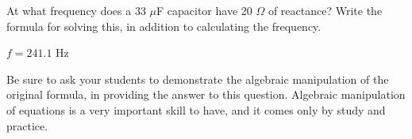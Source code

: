 

At what frequency does a 33 $\mu$F capacitor have 20 $\Omega$ of reactance?  Write the formula for solving this, in addition to calculating the frequency.







$f = 241.1$ Hz







Be sure to ask your students to demonstrate the algebraic manipulation of the original formula, in providing the answer to this question.  Algebraic manipulation of equations is a very important skill to have, and it comes only by study and practice.




